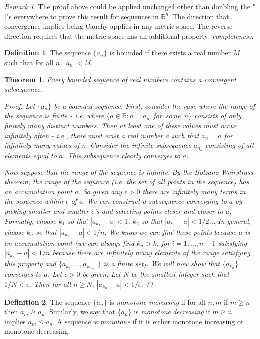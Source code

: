 \documentclass[11pt,a4paper]{report}
\theoremstyle{plain}
\newtheorem{thm}{Theorem}[section]
\theoremstyle{definition}
\newtheorem{defn}{Definition}[section]
\theoremstyle{remark}
\newtheorem*{rem}{Remark}
\begin{document}
\begin{rem}
The proof above could be applied unchanged other than doubling the "$|$"s everywhere to prove this result for sequences in $\mathbb{R}^n$.  The direction that convergence implies being Cauchy applies in any metric space.  The reverse direction requires that the metric space has an additional property: \textit{completeness}.
\end{rem}
\begin{defn}
The sequence $\{a_n\}$ is bounded if there exists a real number $M$ such that for all $n$, $|a_n| < M$.
\end{defn}
\begin{thm}
Every bounded sequence of real numbers contains a convergent subsequence.
\begin{proof}
Let $\{a_n\}$ be a bounded sequence. First, consider the case where the range of the sequence is finite - i.e. where \mbox{$\{a \in \mathbb{R} \colon a = a_n $ for some $n\}$} consists of only finitely many distinct numbers. Then at least one of these values must occur infinitely often - i.e., there must exist a real number $a$ such that $a_n = a$ for infinitely many values of $n$.  Consider the infinite subsequence ${a_{n_k}}$ consisting of all elements equal to $a$.  This subsequence clearly converges to $a$.

Now suppose that the range of the sequence is infinite. By the Bolzano-Weirstrass theorem, the range of the sequence (i.e. the set of all points in the sequence) has an accumulation point $a$. So given any $\epsilon>0$ there are infinitely many terms in the sequence within $\epsilon$ of $a$.  We can construct a subsequence converging to $a$ by picking smaller and smaller $\epsilon$'s and selecting points closer and closer to $a$.  Formally, choose $k_1$ so that $|a_{k_1} - a| < 1$, $k_2$ so that $|a_{k_2} - a| < 1/2$...  In general, choose $k_n$ so that $|a_{k_n} - a| < 1/n$.  We know we can find these points because $a$ is an accumulation point (we can always find $k_n > k_i$ for $i = 1,..., n - 1$ satisfying $|a_{k_n} - a| < 1/n$ because there are infinitely many elements of the range satisfying this property and $\{a_{k_1}, ..., a_{k_{n-1}}\}$ is a finite set).  We will now show that $\{a_{k_n}\}$ converges to $a$.  Let $\epsilon>0$ be given. Let $N$ be the smallest integer such that $1/N < \epsilon$.  Then for all $n \geq N$, $|a_{k_n} - a| < 1/\epsilon$.
\end{proof}
\end{thm}
\begin{defn}
The sequence $\{a_n\}$ is \textit{monotone increasing} if for all $n,m$ if $m\geq n$ then $a_m \geq a_n$.  Similarly, we say that $\{a_n\}$ is \textit{monotone decreasing} if $m \geq n$ implies $a_m \leq a_n$.  A sequence is \textit{monotone} if it is either monotone increasing or monotone decreasing.
\end{defn}
\end{document}

